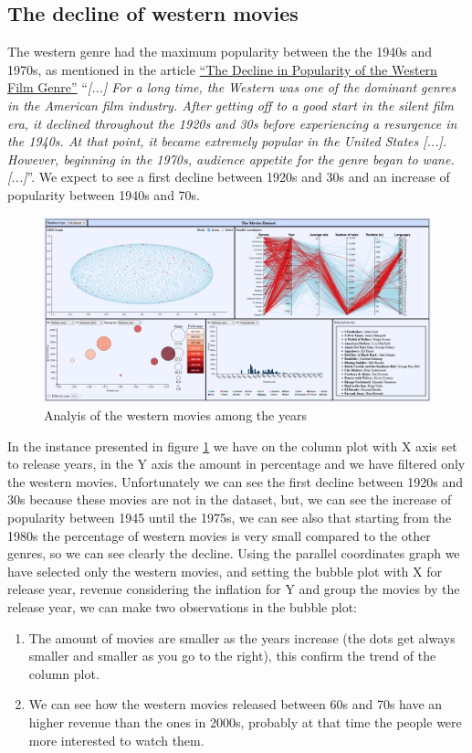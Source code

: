 \documentclass[]{article}
\newcommand{\quotes}[1]{``#1''}
\begin{document}
\subsection{The decline of western movies}
The western genre had the maximum popularity between the the 1940s and 1970s, as mentioned in the article \href{https://screenculturejournal.com/2017/04/the-decline-in-popularity-of-the-western-film-genre/}{\quotes{The Decline in Popularity of the Western Film Genre}} \quotes{\emph{[...] For a long time, the Western was one of the dominant genres in the American film industry. After getting off to a good start in the silent film era, it declined throughout the 1920s and 30s before experiencing a resurgence in the 1940s. At that point, it became extremely popular in the United States [...]. However, beginning in the 1970s, audience appetite for the genre began to wane.[...]}}.
We expect to see a first decline between 1920s and 30s and an increase of popularity between 1940s and 70s.
\begin{figure}[H]
	\centering
	\includegraphics[width=1\linewidth]{images/insights_western}
	\caption[Western movies trend]{Analyis of the western movies among the years}
	\label{fig:insightswestern}
\end{figure}
In the instance presented in figure \ref{fig:insightswestern} we have on the column plot with X axis set to release years, in the Y axis the amount in percentage and we have filtered only the western movies. Unfortunately we can see the first decline between 1920s and 30s because these movies are not in the dataset, but, we can see the increase of popularity between 1945 until the 1975s, we can see also that starting from the 1980s the percentage of western movies is very small compared to the other genres, so we can see clearly the decline.\newline\newline
Using the parallel coordinates graph we have selected only the western movies, and setting the bubble plot with X for release year, revenue considering the inflation for Y and group the movies by the release year, we can make two observations in the bubble plot: 
\begin{enumerate}
	\item The amount of movies are smaller as the years increase (the dots get always smaller and smaller as you go to the right), this confirm the trend of the column plot.
	\item We can see how the western movies released between 60s and 70s have an higher revenue than the ones in 2000s, probably at that time the people were more interested to watch them.
\end{enumerate} 
\end{document}
